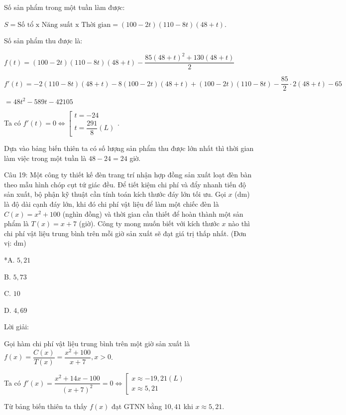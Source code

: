 \documentclass[a4paper,12pt]{article}
\begin{document}
Số sản phẩm trong một tuần làm được:

\(S = \text{Số tổ x Năng suất x Thời gian} = \left(100 - 2 t\right)\left(110 - 8 t\right)(48 + t)\).

Số sản phẩm thu được là:

\(f(t) = \left(100 - 2 t\right)\left(110 - 8 t\right)(48 + t) - \dfrac{85(48 + t)^2 + 130(48 + t)}{2}\)

\(f'(t) = -2\left(110 - 8 t\right)(48 + t) - 8\left(100 - 2 t\right)(48 + t) + \left(100 - 2 t\right)\left(110 - 8 t\right) - \dfrac{85}{2} \cdot 2(48 + t) - 65\)

\(= 48t^{2} - 589t - 42105\)

Ta có \(f'(t) = 0 \Leftrightarrow \left[\begin{array}{l}t = -24 \\ t = \dfrac{291}{8}(L)\end{array}\right.\).

Dựa vào bảng biến thiên ta có số lượng sản phẩm thu được lớn nhất thì thời gian làm việc trong một tuần là \(48 - 24 = 24\) giờ.




Câu 19: Một công ty thiết kế đèn trang trí nhận hợp đồng sản xuất loạt đèn bàn theo mẫu hình chóp cụt tứ giác đều. Để tiết kiệm chi phí và đẩy nhanh tiến độ sản xuất, bộ phận kỹ thuật cần tính toán kích thước đáy lớn tối ưu. Gọi \(x\) (dm) là độ dài cạnh đáy lớn, khi đó chi phí vật liệu để làm một chiếc đèn là \(C(x) = x^2 + 100\) (nghìn đồng) và thời gian cần thiết để hoàn thành một sản phẩm là \(T(x) = x + 7\) (giờ). Công ty mong muốn biết với kích thước \(x\) nào thì chi phí vật liệu trung bình trên mỗi giờ sản xuất sẽ đạt giá trị thấp nhất. (Đơn vị: dm)

*A. \(5,21\)

B. \(5,73\)

C. \(10\)

D. \(4,69\)

Lời giải:


Gọi hàm chi phí vật liệu trung bình trên một giờ sản xuất là \(f(x)=\dfrac{C(x)}{T(x)}=\dfrac{x^2+100}{x+7}, x>0\).

Ta có \(f'(x)=\dfrac{x^2+14x-100}{(x+7)^2}=0 \Leftrightarrow \left[\begin{array}{l}x \approx -19,21(L) \\ x \approx 5,21\end{array}\right.\)

Từ bảng biến thiên ta thấy \(f(x)\) đạt GTNN bằng \(10,41\) khi \(x \approx 5,21\).
\end{document}
